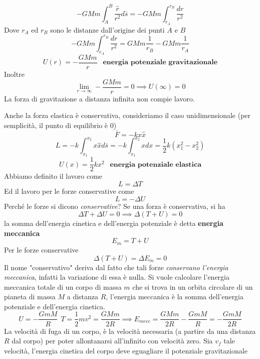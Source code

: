 \documentclass[10pt, letterpaper]{report}
\begin{document}
$$ 
-GMm\int_A^B\frac{\hat r}{r^2} d\bar s=
-GMm\int_{r_A}^{r_B}\frac{dr}{r^2}
$$
Dove $r_A$ ed $r_B$ sono le distanze dall'origine dei punti $A$ e $B$
$$-GMm\int_{r_A}^{r_B}\frac{dr}{r^2}=GMm\frac{1}{r_B}-GMm\frac{1}{r_A} $$
$$ U(r)=-\frac{GMm}{r} \ \  \textbf{ energia potenziale gravitazionale}$$
Inoltre 
$$ \lim_{r\rightarrow \infty}-\frac{GMm}{r}=0\implies U(\infty)=0$$
La forza di gravitazione a distanza infinita non compie lavoro.\begin{center}
\end{center}
Anche la forza elastica è conservativa, consideriamo il caso unidimensionale (per semplicità, il punto di equilibrio 
è 0)
 $$ \bar F = -kx\hat x$$
 $$L=-k\int_{x_1}^{x_2}x\hat x d\bar s =  -k\int_{x_1}^{x_2}xdx=\frac{1}{2}k(x_1^2-x_2^2)$$
 $$ U(x)=\frac{1}{2}kx^2 \ \  \textbf{ energia potenziale elastica}$$
 Abbiamo definito il lavoro come 
 $$ L=\Delta T$$
 Ed il lavoro per le forze conservative come 
 $$L=-\Delta U$$
Perché le forze si dicono \textit{conservative}? Se una forza è conservativa, si ha 
$$ \Delta T+\Delta U = 0 \implies \Delta(T+U)=0$$
 la somma dell'energia cinetica e dell'energia potenziale è detta  \textbf{energia meccanica}
$$E_{m}=T+U$$
Per le forze conservative
$$ \Delta(T+U)=\Delta E_m=0$$
Il nome "conservativo" deriva dal fatto che tali forze \textit{conservano l'energia meccanica}, infatti 
la variazione di essa è nulla.\acc 
Si vuole calcolare l'energia meccanica totale di un corpo di massa $m$ che si trova in un orbita circolare 
di un pianeta di massa $M$ a distanza $R$, l'energia meccanica è la somma dell'energia potenziale e dell'energia 
cinetica. $$ U=-\frac{GmM}{R}\ \ T=\frac{1}{2}mv^2=\frac{GMm}{2R}\implies E_{mecc}=\frac{GMm}{2R}-\frac{GmM}{R}=-\frac{GmM}{2R}$$
 La velocità di fuga di un corpo, è la velocità necessaria (a partire da una distanza $R$ dal corpo) per 
poter allontanarsi all'infinito con velocità zero. \acc 
Sia $v_f$ tale velocità, l'energia cinetica del corpo deve eguagliare il potenziale gravitazionale 
\end{document}
